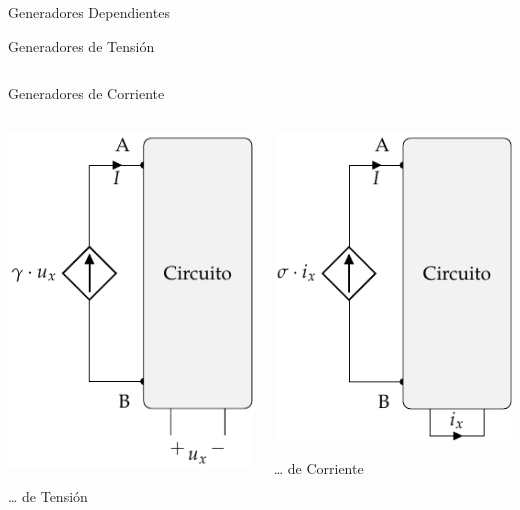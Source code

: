 \documentclass[aspectratio=169, usenames,svgnames,dvipsnames]{beamer}
\begin{document}
\begin{frame}[label={sec:orgb4c2314}]{Generadores Dependientes}
\begin{block}{Generadores de Tensión}
\begin{columns}
\begin{column}{0.5\columnwidth}
\end{column}
\end{columns}
\end{block}
\begin{block}{Generadores de Corriente}
\begin{columns}
\begin{column}{0.5\columnwidth}
 \begin{center}
\includegraphics[height=0.7\textheight]{../figs/FuenteCorrienteDependienteTension.pdf}
\end{center}
\ldots{} de Tensión
\end{column}
\begin{column}{0.5\columnwidth}
 \begin{center}
\includegraphics[height=0.7\textheight]{../figs/FuenteCorrienteDependienteCorriente.pdf}
\end{center}
\ldots{} de Corriente
\end{column}
\end{columns}
\end{block}
\end{frame}
\end{document}
